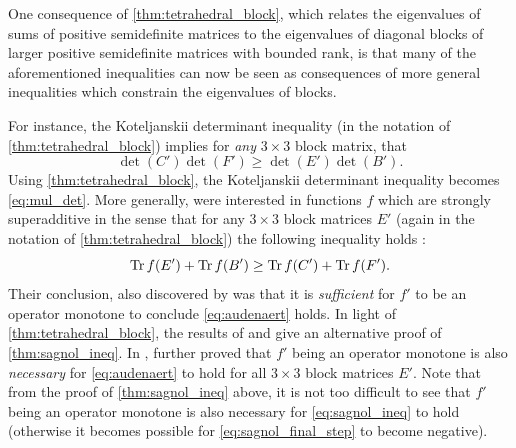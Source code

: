 \documentclass[notitlepage, 10pt]{article}
\begin{document}
\begin{rem}
    One consequence of \cref{thm:tetrahedral_block}, which relates the eigenvalues of sums of positive semidefinite matrices to the eigenvalues of diagonal blocks of larger positive semidefinite matrices with bounded rank, is that many of the aforementioned inequalities can now be seen as consequences of more general inequalities which constrain the eigenvalues of blocks.

    For instance, the Koteljanskii determinant inequality \cite{johnson1993determinantal} (in the notation of \cref{thm:tetrahedral_block}) implies for \textit{any} $3\times 3$ block matrix, that
    \begin{equation}
        \det(C')\det(F') \geq \det(E')\det(B').
    \end{equation}
    Using \cref{thm:tetrahedral_block}, the Koteljanskii determinant inequality becomes \cref{eq:mul_det}.
    More generally, \citeauthor{audenaert2010strongly} were interested in functions $f$ which are strongly superadditive in the sense that for any $3\times 3$ block matrices $E'$ (again in the notation of \cref{thm:tetrahedral_block}) the following inequality holds \cite{audenaert2010strongly}:
    \begin{equation}
        \label{eq:audenaert}
        \operatorname{Tr} f(E') + \operatorname{Tr} f(B') \geq \operatorname{Tr} f(C') + \operatorname{Tr} f(F').
    \end{equation}
    Their conclusion, also discovered by \citeauthor{friedland2013submodular} \cite{friedland2013submodular} was that it is \textit{sufficient} for $f'$ to be an operator monotone to conclude \cref{eq:audenaert} holds.
    In light of \cref{thm:tetrahedral_block}, the results of \citeauthor{audenaert2010strongly} and \cite{friedland2013submodular} give an alternative proof of \cref{thm:sagnol_ineq}.
    In \cite{lewin2014family}, \citeauthor{lewin2014family} further proved that $f'$ being an operator monotone is also \textit{necessary} for \cref{eq:audenaert} to hold for all $3\times 3$ block matrices $E'$.
    Note that from the proof of \cref{thm:sagnol_ineq} above, it is not too difficult to see that $f'$ being an operator monotone is also necessary for \cref{eq:sagnol_ineq} to hold (otherwise it becomes possible for \cref{eq:sagnol_final_step} to become negative).
\end{rem}
\end{document}
